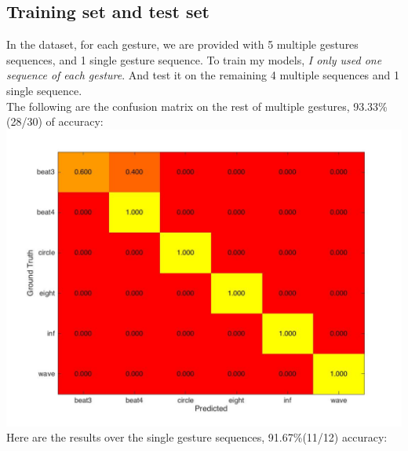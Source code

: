 \documentclass[english]{article}
\begin{document}
\subsection {Training set and test set}
In the dataset, for each gesture, we are provided with 5 multiple gestures sequences, and 1 single gesture sequence. To train my models, \emph{I only used one sequence of each gesture}. And test it on the remaining 4 multiple sequences and 1 single sequence. \\
The following are the confusion matrix on the rest of multiple gestures, 93.33\%(28/30) of accuracy:\\
\includegraphics[width=\textwidth]{images/cfm.jpg}\\
Here are the results over the single gesture sequences, 91.67\%(11/12) accuracy:\\
\end{document}
